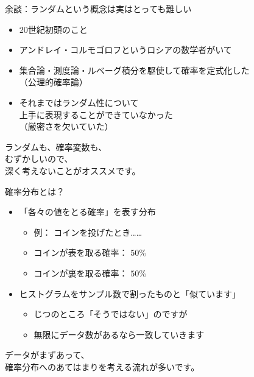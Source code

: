 \documentclass[dvipdfmx,cjk]{beamer}
\begin{document}
\begin{frame}{余談：ランダムという概念は実はとっても難しい}


\begin{itemize}
    \item 20世紀初頭のこと
    \item アンドレイ・コルモゴロフというロシアの数学者がいて
    \item 集合論・測度論・ルベーグ積分を駆使して確率を定式化した\\
    （公理的確率論）
    \item それまではランダム性について\\上手に表現することができていなかった\\（厳密さを欠いていた）
\end{itemize}

\vskip 1cm

ランダムも、確率変数も、\\
むずかしいので、\\
深く考えないことがオススメです。


\end{frame}


\begin{frame}{確率分布とは？}

\begin{itemize}

    \item 「各々の値をとる確率」を表す分布
        \begin{itemize}
        \item 例： コインを投げたとき……
        \item コインが表を取る確率： $50\%$
        \item コインが裏を取る確率： $50\%$
        \end{itemize}

    \item ヒストグラムをサンプル数で割ったものと「似ています」
        \begin{itemize}
        \item じつのところ「そうではない」のですが
        \item 無限にデータ数があるなら一致していきます
        \end{itemize}

\end{itemize}

\vskip 1cm

データがまずあって、\\
確率分布へのあてはまりを考える流れが多いです。

\end{frame}
\end{document}

